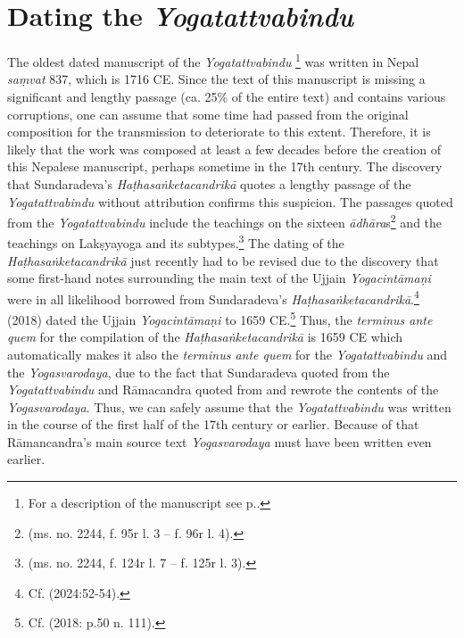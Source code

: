 \section{Dating the \textit{Yogatattvabindu}}
\label{dating}
The oldest dated manuscript of the \textit{Yogatattvabindu} \footnote{For a description of the manuscript see  p.\pageref{n1description}.} was written in Nepal \textit{saṃvat} 837, which is 1716 CE. Since the text of this manuscript is missing a significant and lengthy passage (ca. 25\% of the entire text) and contains various corruptions, one can assume that some time had passed from the original composition for the transmission to deteriorate to this extent. Therefore, it is likely that the work was composed at least a few decades before the creation of this Nepalese manuscript, perhaps sometime in the 17th century. The discovery that Sundaradeva's \textit{Haṭhasaṅketacandrikā} quotes a lengthy passage of the \textit{Yogatattvabindu} without attribution confirms this suspicion. The passages quoted from the \textit{Yogatattvabindu} include the teachings on the sixteen \textit{ādhāra}s\footnote{ (ms. no. 2244, f. 95r l. 3 -- f. 96r l. 4).} and the teachings on Lakṣyayoga and its subtypes.\footnote{ (ms. no. 2244, f. 124r l. 7 -- f. 125r l. 3).} The dating of the \textit{Haṭhasaṅketacandrikā} just recently had to be revised due to the discovery that some first-hand notes surrounding the main text of the Ujjain \textit{Yogacintāmaṇi} were in all likelihood borrowed from Sundaradeva's \textit{Haṭhasaṅketacandrikā}.\footnote{Cf. \citeauthor{birch2024} (2024:52-54).} \citeauthor{birch2018proliferation} (2018) dated the Ujjain \textit{Yogacintāmaṇi} to 1659 CE.\footnote{Cf. \citeauthor{birch2018proliferation} (2018: p.50 n. 111).} Thus, the \textit{terminus ante quem} for the compilation of the \textit{Haṭhasaṅketacandrikā} is 1659 CE which automatically makes it also the \textit{terminus ante quem} for the \textit{Yogatattvabindu} and the \textit{Yogasvarodaya}, due to the fact that Sundaradeva quoted from the \textit{Yogatattvabindu} and Rāmacandra quoted from and rewrote the contents of the \textit{Yogasvarodaya}. Thus, we can safely assume that the \textit{Yogatattvabindu} was written in the course of the first half of the 17th century or earlier. Because of that Rāmancandra's main source text \textit{Yogasvarodaya} must have been written even earlier.

